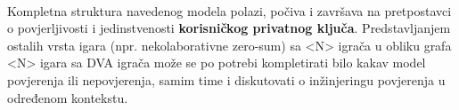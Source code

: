 \paragraph*{}
Kompletna struktura navedenog modela polazi, počiva i završava na pretpostavci o povjerljivosti i jedinstvenosti \textbf{korisničkog privatnog ključa}. Predstavljanjem ostalih vrsta igara (npr. nekolaborativne zero-sum) sa <N> igrača u obliku grafa <N> igara sa DVA igrača može se po potrebi kompletirati bilo kakav model povjerenja ili nepovjerenja, samim time i diskutovati o inžinjeringu povjerenja u određenom kontekstu.